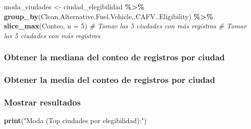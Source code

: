 \documentclass[
]{article}
\newenvironment{Shaded}{\begin{snugshade}}{\end{snugshade}}
\newcommand{\AttributeTok}[1]{\textcolor[rgb]{0.13,0.29,0.53}{#1}}
\newcommand{\CommentTok}[1]{\textcolor[rgb]{0.56,0.35,0.01}{\textit{#1}}}
\newcommand{\DecValTok}[1]{\textcolor[rgb]{0.00,0.00,0.81}{#1}}
\newcommand{\FunctionTok}[1]{\textcolor[rgb]{0.13,0.29,0.53}{\textbf{#1}}}
\newcommand{\NormalTok}[1]{#1}
\newcommand{\OtherTok}[1]{\textcolor[rgb]{0.56,0.35,0.01}{#1}}
\newcommand{\SpecialCharTok}[1]{\textcolor[rgb]{0.81,0.36,0.00}{\textbf{#1}}}
\newcommand{\StringTok}[1]{\textcolor[rgb]{0.31,0.60,0.02}{#1}}
\begin{document}
\begin{Shaded}
\begin{Highlighting}[]
\NormalTok{moda\_ciudades }\OtherTok{\textless{}{-}}\NormalTok{ ciudad\_elegibilidad }\SpecialCharTok{\%\textgreater{}\%}
  \FunctionTok{group\_by}\NormalTok{(Clean.Alternative.Fuel.Vehicle..CAFV..Eligibility) }\SpecialCharTok{\%\textgreater{}\%}
  \FunctionTok{slice\_max}\NormalTok{(Conteo, }\AttributeTok{n =} \DecValTok{5}\NormalTok{)  }\CommentTok{\# Tomar las 5 ciudades con más registros}
\CommentTok{\# Tomar las 5 ciudades con más registros}
\end{Highlighting}
\end{Shaded}

\subsubsection{Obtener la mediana del conteo de registros por
ciudad}\label{obtener-la-mediana-del-conteo-de-registros-por-ciudad}

\begin{Shaded}
\end{Shaded}

\subsubsection{Obtener la media del conteo de registros por
ciudad}\label{obtener-la-media-del-conteo-de-registros-por-ciudad}

\begin{Shaded}
\end{Shaded}

\subsubsection{Mostrar resultados}\label{mostrar-resultados}

\begin{Shaded}
\begin{Highlighting}[]
\FunctionTok{print}\NormalTok{(}\StringTok{"Moda (Top ciudades por elegibilidad):"}\NormalTok{) }
\end{Highlighting}
\end{Shaded}
\end{document}
